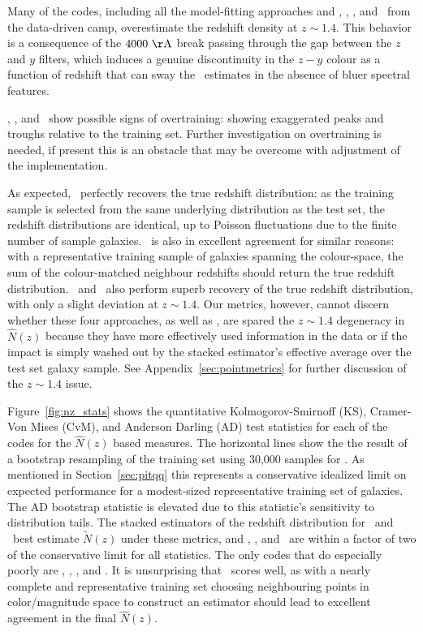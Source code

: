 Many of the codes, including all the model-fitting approaches and \annz, \gpz, \metaphor, and \skynet\ from the data-driven camp, overestimate the redshift density at $z \sim 1.4$.
This behavior is a consequence of the $4000\ {\rm \AA}$ break passing through the gap between the $z$ and $y$ filters, which induces a genuine discontinuity in the $z - y$ colour as a function of redshift that can sway the \pzpdf\ estimates in the absence of bluer spectral features.

\annz, \gpz, and \metaphor\ show possible signs of overtraining: showing exaggerated peaks and troughs relative to the training set.  Further investigation on overtraining is needed, if present this is an obstacle that may be overcome with adjustment of the implementation.

As expected, \trainz\ perfectly recovers the true redshift distribution: as the training sample is selected from the same underlying distribution as the test set, the redshift distributions are identical, up to Poisson fluctuations due to the finite number of sample galaxies.
\cmnn\ is also in excellent agreement for similar reasons: with a representative training sample of galaxies spanning the colour-space, the sum of the colour-matched neighbour redshifts should return the true redshift distribution.
\flexzboost\ and \tpz\ also perform superb recovery of the true redshift distribution, with only a slight deviation at $z \sim 1.4$.
Our metrics, however, cannot discern whether these four approaches, as well as \delight, are spared the $z \sim 1.4$ degeneracy in $\hat{N}(z)$ because they have more effectively used information in the data or if the impact is simply washed out by the stacked estimator's effective average over the test set galaxy sample.
See Appendix~\ref{sec:pointmetrics} for further discussion of the $z \sim 1.4$ issue.

Figure~\ref{fig:nz_stats} shows the quantitative Kolmogorov-Smirnoff (KS), Cramer-Von Mises (CvM), and Anderson Darling (AD) test statistics for each of the codes for the $\hat{N}(z)$ based measures.  The horizontal lines show the the result of a bootstrap resampling of the training set using 30,000 samples for \trainz.  As mentioned in Section~\ref{sec:pitqq} this represents a conservative idealized limit on expected performance for a modest-sized representative training set of galaxies.  The AD bootstrap statistic is elevated due to this statistic's sensitivity to distribution tails.
The stacked estimators of the redshift distribution for \cmnn\ and \trainz\ best estimate $\tilde{N}(z)$ under these metrics, and \bpz, \gpz, and \tpz\ are within a factor of two of the conservative limit for all statistics.  The only codes that do especially poorly are \eazy, \lephare, \metaphor, and \skynet.
It is unsurprising that \cmnn\ scores well, as with a nearly complete and representative training set choosing neighbouring points in color/magnitude space to construct an estimator should lead to excellent agreement in the final $\hat{N}(z)$.

